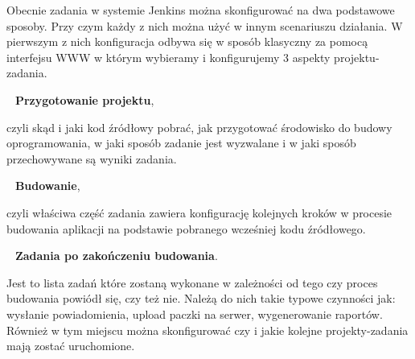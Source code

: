 \documentclass[12pt]{article}
\renewcommand{\_}{\kern-1.5pt\textunderscore\kern-1.5pt}
\begin{document}
\begin{adjustwidth}{1.0in}{0.0in}
Obecnie zadania w systemie Jenkins można skonfigurować na dwa podstawowe sposoby. Przy czym każdy z nich można użyć w innym scenariuszu działania. W pierwszym z nich konfiguracja odbywa się w sposób klasyczny za pomocą interfejsu WWW w którym wybieramy i konfigurujemy 3 aspekty projektu-zadania.\par

\end{adjustwidth}

\begin{adjustwidth}{1.5in}{0.0in}
\  \textbf{Przygotowanie projektu},\par

\end{adjustwidth}

\begin{adjustwidth}{1.5in}{0.0in}
czyli skąd i jaki kod źródłowy pobrać, jak przygotować środowisko do budowy oprogramowania, w jaki sposób zadanie jest wyzwalane i w jaki sposób przechowywane są wyniki zadania.\par

\end{adjustwidth}

\begin{adjustwidth}{1.5in}{0.0in}
\  \textbf{Budowanie},\par

\end{adjustwidth}

\begin{adjustwidth}{1.5in}{0.0in}
 czyli właściwa część zadania zawiera konfigurację kolejnych kroków w procesie budowania aplikacji na podstawie pobranego wcześniej kodu źródłowego.\par

\end{adjustwidth}

\begin{adjustwidth}{1.5in}{0.0in}
\  \textbf{Zadania po zakończeniu budowania}. \par

\end{adjustwidth}

\begin{adjustwidth}{1.5in}{0.0in}
Jest to lista zadań które zostaną wykonane w zależności od tego czy proces budowania powiódł się, czy też nie. Należą do nich takie typowe czynności jak: wysłanie powiadomienia, upload paczki na serwer, wygenerowanie raportów. Również w tym miejscu można skonfigurować czy i jakie kolejne projekty-zadania mają zostać uruchomione.\par

\end{adjustwidth}
\end{document}
